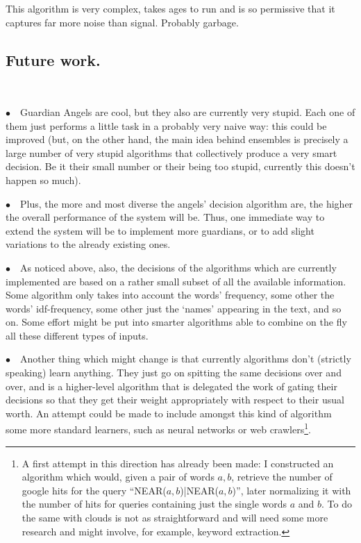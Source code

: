 \documentclass[11pt]{article}
\begin{document}
This algorithm is very complex, takes ages to run and is so permissive that it captures far more noise than signal. Probably garbage.


\subsection{Future work.}
~

$\bullet \quad$Guardian Angels are cool, but they also are currently very stupid. Each one of them just performs a little task in a probably very naive way: this could be improved (but, on the other hand, the main idea behind ensembles is precisely a large number of very stupid algorithms that collectively produce a very smart decision. Be it their small number or their being too stupid, currently this doesn't happen so much).

$\bullet \quad$Plus, the more and most diverse the angels' decision algorithm are, the higher the overall performance of the system will be. Thus, one immediate way to extend the system will be to implement more guardians, or to add slight variations to the already existing ones.

$\bullet \quad$As noticed above, also, the decisions of the algorithms which are currently implemented are based on a rather small subset of all the available information. Some algorithm only takes into account the words' frequency, some other the words' idf-frequency, some other just the `names' appearing in the text, and so on. Some effort might be put into smarter algorithms able to combine on the fly all these different types of inputs.

$\bullet \quad$Another thing which might change is that currently algorithms don't (strictly speaking) learn anything. They just go on spitting the same decisions over and over, and is a higher-level algorithm that is delegated the work of gating their decisions so that they get their weight appropriately with respect to their usual worth. An attempt could be made to include amongst this kind of algorithm some more standard learners, such as neural networks or web crawlers\footnote{
A first attempt in this direction has already been made: I constructed an algorithm which would, given a pair of words $a,b$, retrieve the number of google hits for the query ``NEAR($a,b$)|NEAR($a,b$)'', later normalizing it with the number of hits for queries containing just the single words $a$ and $b$. To do the same with clouds is not as straightforward and will need some more research and might involve, for example, keyword extraction.}.
\end{document}
